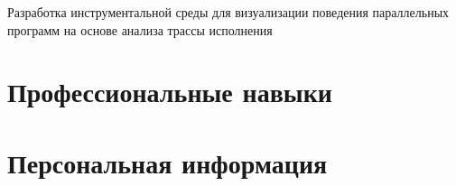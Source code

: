 \documentclass[11pt, a4paper, russian]{moderncv}
\begin{document}
{\newline Разработка инструментальной среды для визуализации поведения параллельных программ
на основе анализа трассы исполнения}{}{}{}

\section{Профессиональные навыки}


\section{Персональная информация}

\nocite{*}



\normalsize
\end{document}
